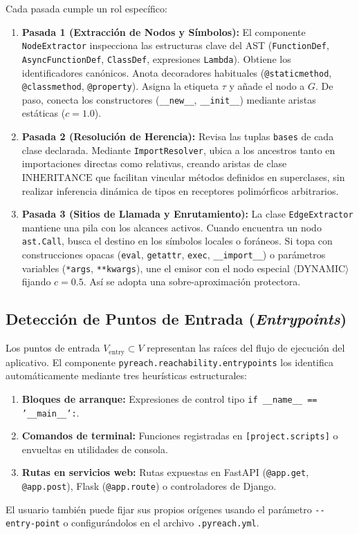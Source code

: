 \documentclass[conference]{IEEEtran}
\newcommand{\clioption}[1]{\texttt{-{}-#1}}
\newcommand{\pydunder}[1]{\texttt{\_\_#1\_\_}}
\begin{document}
Cada pasada cumple un rol específico:
\begin{enumerate}
    \item \textbf{Pasada 1 (Extracción de Nodos y Símbolos):} El componente \texttt{NodeExtractor} inspecciona las estructuras clave del AST (\texttt{FunctionDef}, \texttt{AsyncFunctionDef}, \texttt{ClassDef}, expresiones \texttt{Lambda}). Obtiene los identificadores canónicos. Anota decoradores habituales (\texttt{@staticmethod}, \texttt{@classmethod}, \texttt{@property}). Asigna la etiqueta $\tau$ y añade el nodo a $G$. De paso, conecta los constructores (\pydunder{new}, \pydunder{init}) mediante aristas estáticas ($c=1.0$).
    \item \textbf{Pasada 2 (Resolución de Herencia):} Revisa las tuplas \texttt{bases} de cada clase declarada. Mediante \texttt{ImportResolver}, ubica a los ancestros tanto en importaciones directas como relativas, creando aristas de clase $\text{INHERITANCE}$ que facilitan vincular métodos definidos en superclases, sin realizar inferencia dinámica de tipos en receptores polimórficos arbitrarios.
    \item \textbf{Pasada 3 (Sitios de Llamada y Enrutamiento):} La clase \texttt{EdgeExtractor} mantiene una pila con los alcances activos. Cuando encuentra un nodo \texttt{ast.Call}, busca el destino en los símbolos locales o foráneos. Si topa con construcciones opacas (\texttt{eval}, \texttt{getattr}, \texttt{exec}, \texttt{\_\_import\_\_}) o parámetros variables (\texttt{*args}, \texttt{**kwargs}), une el emisor con el nodo especial $\langle\text{DYNAMIC}\rangle$ fijando $c=0.5$. Así se adopta una sobre-aproximación protectora.
\end{enumerate}

\subsection{Detección de Puntos de Entrada (\textit{Entrypoints})}
Los puntos de entrada $V_{\text{entry}} \subset V$ representan las raíces del flujo de ejecución del aplicativo. El componente \texttt{pyreach.reachability.entrypoints} los identifica automáticamente mediante tres heurísticas estructurales:
\begin{enumerate}
    \item \textbf{Bloques de arranque:} Expresiones de control tipo \texttt{if \pydunder{name} == '\pydunder{main}':}.
    \item \textbf{Comandos de terminal:} Funciones registradas en \texttt{[project.scripts]} o envueltas en utilidades de consola.
    \item \textbf{Rutas en servicios web:} Rutas expuestas en FastAPI (\texttt{@app.get}, \texttt{@app.post}), Flask (\texttt{@app.route}) o controladores de Django.
\end{enumerate}
El usuario también puede fijar sus propios orígenes usando el parámetro \clioption{entry-point} o configurándolos en el archivo \texttt{.pyreach.yml}.
\end{document}
